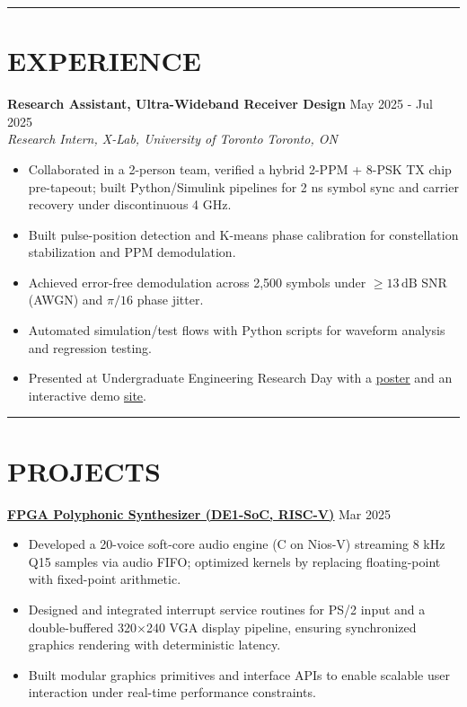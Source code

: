 \documentclass[letterpaper,10pt]{article}
\begin{document}
\noindent\rule{\linewidth}{1pt}

\section*{\textbf{EXPERIENCE}}
\noindent
\textbf{Research Assistant, Ultra-Wideband Receiver Design} \hfill May 2025 - Jul 2025\\
\textit{Research Intern, X-Lab, University of Toronto} \hfill \textit{Toronto, ON}
\begin{itemize}[leftmargin=0.2in]
    \item Collaborated in a 2-person team, verified a hybrid 2-PPM + 8-PSK TX chip pre-tapeout; built Python/Simulink pipelines for 2 ns symbol sync and carrier recovery under discontinuous 4 GHz.
	\item Built pulse-position detection and K-means phase calibration for constellation stabilization and PPM demodulation.
    \item Achieved error-free demodulation across 2,500 symbols under $\geq 13\,\mathrm{dB}$ SNR (AWGN) and $\pi/16$ phase jitter.
    \item Automated simulation/test flows with Python scripts for waveform analysis and regression testing.
    \item Presented at Undergraduate Engineering Research Day with a \href{https://docs.google.com/presentation/d/1h4lmc_HQLzNvtGE4oE1jedOlNVZjL3iztEyGKnC-ico/edit?usp=sharing}{\uline{poster}} and an interactive demo \href{https://github.com/Ken-2511/ppm-psk-visualize}{\uline{site}}.
\end{itemize}

\noindent\rule{\linewidth}{1pt}

\section*{\textbf{PROJECTS}}
\noindent\href{https://github.com/alexzjm/ece243-sound-synthesizer}{\uline{
    \textbf{FPGA Polyphonic Synthesizer (DE1-SoC, RISC-V)}}} \hfill Mar 2025
\begin{itemize}[leftmargin=0.2in]
  \item Developed a 20-voice soft-core audio engine (C on Nios-V) streaming 8 kHz Q15 samples via audio FIFO; optimized kernels by replacing floating-point with fixed-point arithmetic.  
  \item Designed and integrated interrupt service routines for PS/2 input and a double-buffered 320×240 VGA display pipeline, ensuring synchronized graphics rendering with deterministic latency.
  \item Built modular graphics primitives and interface APIs to enable scalable user interaction under real-time performance constraints.
\end{itemize}
\end{document}
